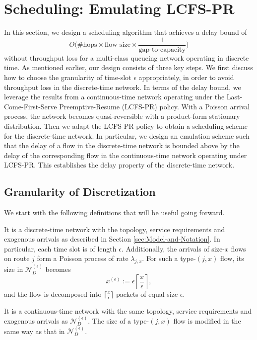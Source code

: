 
\section{Scheduling: Emulating LCFS-PR\label{sec:scheduling}}

In this section, we design a scheduling algorithm that achieves a
delay bound of 
$$O\Big(\# \text{hops} \times  \text{flow-size} \times \frac{1}{\text{gap-to-capacity}}\Big)$$ 
 without throughput loss for a multi-class queueing network operating in discrete
 time. As mentioned earlier, our design consists of three key steps.
We first discuss how to choose the granularity of time-slot $\epsilon$
appropriately, in order to avoid throughput loss in the discrete-time
network. In terms of the delay bound, we leverage the results from
a continuous-time network operating under the Last-Come-First-Serve
Preemptive-Resume (LCFS-PR) policy. With a Poisson arrival process,
the network becomes quasi-reversible with a product-form stationary
distribution. Then we adapt the LCFS-PR policy to obtain a scheduling
scheme for the discrete-time network. In particular, we design an emulation
scheme such that the delay of a flow in the discrete-time network
is bounded above by the delay of the corresponding flow in the continuous-time
network operating under LCFS-PR. This establishes the delay property
of the discrete-time network. 


\subsection{Granularity of Discretization }

We start with the following definitions that will be useful going forward.
\begin{defn}
It is a discrete-time network with the topology, service requirements and
exogenous arrivals as described in Section \ref{sec:Model-and-Notation}.
In particular, each time slot is of length $\epsilon$. Additionally,
the arrivals of size-$x$ flows on route $j$ form a Poisson process
of rate $\lambda_{j,x}.$ For such a type-$(j,x)$ flow, its size in 
$\mathcal{N}_{D}^{(\epsilon)}$
becomes
\[
x^{(\epsilon)}:=\epsilon\left\lceil \frac{x}{\epsilon}\right\rceil ,
\]
and the flow is decomposed into $\lceil\frac{x}{\epsilon}\rceil$
packets of equal size $\epsilon$. 
\end{defn}
%
\begin{defn}
It is a continuous-time network with the same topology, service requirements
and exogenous arrivals as $\mathcal{N}_{D}^{(\epsilon)}.$ The size
of a type-$(j,x)$ flow is modified in the same way as that in $\mathcal{N}_{D}^{(\epsilon)}$. 
\end{defn}

